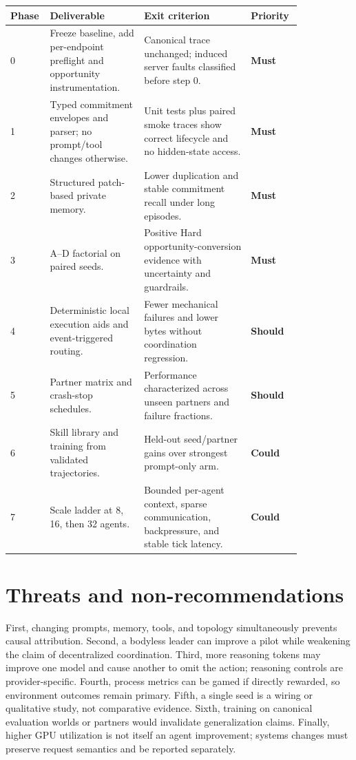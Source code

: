 \documentclass[11pt]{article}
\newcommand{\must}{\textbf{Must}}
\newcommand{\should}{\textbf{Should}}
\newcommand{\could}{\textbf{Could}}
\begin{document}
\begin{longtable}{p{0.06\linewidth}p{0.30\linewidth}p{0.34\linewidth}p{0.14\linewidth}}
\toprule
Phase & Deliverable & Exit criterion & Priority \\
\midrule
\endhead
0 & Freeze baseline, add per-endpoint preflight and opportunity instrumentation. & Canonical trace unchanged; induced server faults classified before step 0. & \must \\
1 & Typed commitment envelopes and parser; no prompt/tool changes otherwise. & Unit tests plus paired smoke traces show correct lifecycle and no hidden-state access. & \must \\
2 & Structured patch-based private memory. & Lower duplication and stable commitment recall under long episodes. & \must \\
3 & A--D factorial on paired seeds. & Positive Hard opportunity-conversion evidence with uncertainty and guardrails. & \must \\
4 & Deterministic local execution aids and event-triggered routing. & Fewer mechanical failures and lower bytes without coordination regression. & \should \\
5 & Partner matrix and crash-stop schedules. & Performance characterized across unseen partners and failure fractions. & \should \\
6 & Skill library and training from validated trajectories. & Held-out seed/partner gains over strongest prompt-only arm. & \could \\
7 & Scale ladder at 8, 16, then 32 agents. & Bounded per-agent context, sparse communication, backpressure, and stable tick latency. & \could \\
\bottomrule
\end{longtable}

\section{Threats and non-recommendations}

First, changing prompts, memory, tools, and topology simultaneously prevents causal attribution.
Second, a bodyless leader can improve a pilot while weakening the claim of decentralized
coordination.  Third, more reasoning tokens may improve one model and cause another to omit the
action; reasoning controls are provider-specific.  Fourth, process metrics can be gamed if directly
rewarded, so environment outcomes remain primary.  Fifth, a single seed is a wiring or qualitative
study, not comparative evidence.  Sixth, training on canonical evaluation worlds or partners would
invalidate generalization claims.  Finally, higher GPU utilization is not itself an agent improvement;
systems changes must preserve request semantics and be reported separately.
\end{document}
